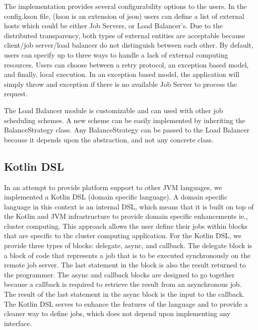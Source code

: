 The implementation provides several configurability options to the users.
In the config.kson file, (kson is an extension of json) users can
define a list of external hosts which could be either Job Servers,
or Load Balancer's.
Due to the distributed transparency, both types of external entities
are acceptable because client/job server/load balancer do
not distinguish between each other.
By default, users can specify up to three ways to handle
a lack of external computing resources.
Users can choose between a retry protocol, an exception based model,
and finally, local execution.
In an exception based model, the application will simply throw
and exception if there is no available Job Server
to process the request.

The Load Balancer module is customizable and can used with other
job scheduling schemes.
A new scheme can be easily implemented by inheriting the BalanceStrategy
class.
Any BalanceStrategy can be passed to the Load Balancer because it depends upon
the abstraction, and not any concrete class.

\subsection{Kotlin DSL}\label{subsec:kotlinDsl}

In an attempt to provide platform support to other JVM languages, we
implemented a Kotlin DSL (domain specific language).
A domain specific language in this context is an internal DSL, which
means that it is built on top of the Kotlin and JVM infrastructure
to provide domain specific enhancements ie., cluster computing.
This approach allows the user define their jobs within blocks
that are specific to the cluster computing application.
For the Kotlin DSL, we provide three types of blocks:
delegate, async, and callback.
The delegate block is a block of code that represents a job
that is to be executed synchronously on the remote job server.
The last statement in the block is also the result returned to the
programmer.
The async and callback blocks are designed to go together because
a callback is required to retrieve the result from an asynchronous
job.
The result of the last statement in the async block is the input
to the callback.
The Kotlin DSL serves to enhance the features of the language and to
provide a cleaner way to define jobs, which does not depend upon
implementing any interface.
